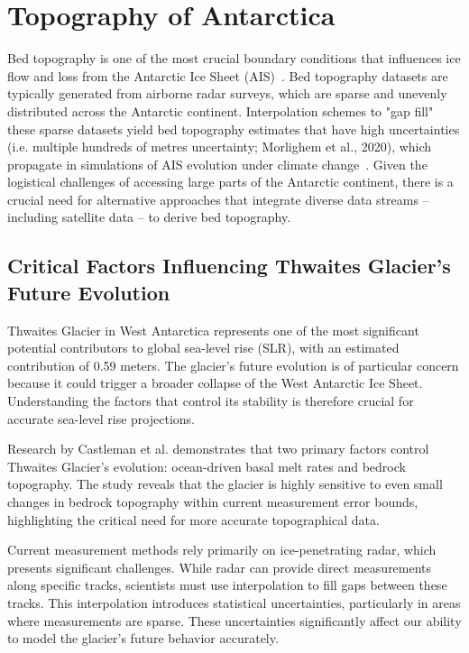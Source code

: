 

\section*{Topography of Antarctica}\label{review}

Bed topography is one of the most crucial boundary conditions that influences ice flow and loss from the Antarctic Ice Sheet (AIS)~\cite{Morlighem_2020}. Bed topography datasets are typically generated from airborne radar surveys, which are sparse and unevenly distributed across the Antarctic continent. Interpolation schemes to "gap fill" these sparse datasets yield bed topography estimates that have high uncertainties (i.e. multiple hundreds of metres uncertainty; Morlighem et al., 2020), which propagate in simulations of AIS evolution under climate change~\cite{Castleman_2022}. Given the logistical challenges of accessing large parts of the Antarctic continent, there is a crucial need for alternative approaches that integrate diverse data streams – including satellite data – to derive bed topography.

\subsection*{Critical Factors Influencing Thwaites Glacier's Future Evolution}

Thwaites Glacier in West Antarctica represents one of the most significant potential contributors to global sea-level rise (SLR), with an estimated contribution of 0.59 meters. The glacier's future evolution is of particular concern because it could trigger a broader collapse of the West Antarctic Ice Sheet. Understanding the factors that control its stability is therefore crucial for accurate sea-level rise projections.

Research by Castleman et al. \cite{Castleman_2022} demonstrates that two primary factors control Thwaites Glacier's evolution: ocean-driven basal melt rates and bedrock topography. The study reveals that the glacier is highly sensitive to even small changes in bedrock topography within current measurement error bounds, highlighting the critical need for more accurate topographical data.

Current measurement methods rely primarily on ice-penetrating radar, which presents significant challenges. While radar can provide direct measurements along specific tracks, scientists must use interpolation to fill gaps between these tracks. This interpolation introduces statistical uncertainties, particularly in areas where measurements are sparse. These uncertainties significantly affect our ability to model the glacier's future behavior accurately.

